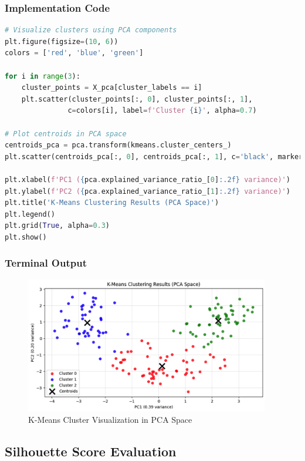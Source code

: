 \documentclass[12pt,a4paper]{article}
\begin{document}
\subsubsection{Implementation Code}
\begin{lstlisting}[language=Python, caption=Cluster Visualization in PCA Space]
# Visualize clusters using PCA components
plt.figure(figsize=(10, 6))
colors = ['red', 'blue', 'green']

for i in range(3):
    cluster_points = X_pca[cluster_labels == i]
    plt.scatter(cluster_points[:, 0], cluster_points[:, 1], 
               c=colors[i], label=f'Cluster {i}', alpha=0.7)

# Plot centroids in PCA space
centroids_pca = pca.transform(kmeans.cluster_centers_)
plt.scatter(centroids_pca[:, 0], centroids_pca[:, 1], c='black', marker='x', s=200, linewidths=3, label='Centroids')

plt.xlabel(f'PC1 ({pca.explained_variance_ratio_[0]:.2f} variance)')
plt.ylabel(f'PC2 ({pca.explained_variance_ratio_[1]:.2f} variance)')
plt.title('K-Means Clustering Results (PCA Space)')
plt.legend()
plt.grid(True, alpha=0.3)
plt.show()
\end{lstlisting}

\subsubsection{Terminal Output}
\begin{figure}[h!]
\centering
    \includegraphics[width=0.95\textwidth]{Figures/cluster_visualization.png}
    \caption{K-Means Cluster Visualization in PCA Space}
\end{figure}

\subsection{Silhouette Score Evaluation}
\end{document}
